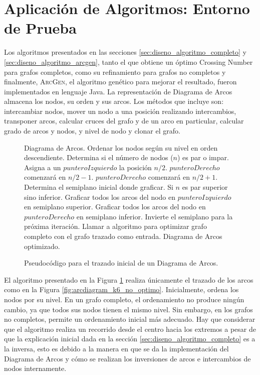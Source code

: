\section{Aplicación de Algoritmos: Entorno de Prueba}
Los algoritmos presentados en las secciones \ref{sec:diseno_algoritmo_completo} y \ref{sec:diseno_algoritmo_arcgen}, tanto el que obtiene un óptimo Crossing Number para grafos completos, como su refinamiento para grafos no completos y finalmente, \textsc{ArcGen}, el algoritmo genético para mejorar el resultado, fueron implementados en lenguaje Java. %
	La  representación de Diagrama de Arcos %
	almacena los nodos, su orden y sus arcos. Los métodos que incluye son: intercambiar nodos, mover un nodo a una posición realizando intercambios, transponer arcos, calcular cruces del grafo y de un arco en particular, calcular grado de arcos y nodos, y nivel de nodo y clonar el grafo.
		\begin{figure}
	    \begin{center}
		\begin{algorithmic}[1]
			\REQUIRE Diagrama de Arcos.
			\STATE Ordenar los nodos según su nivel en orden descendiente.
			\STATE Determina si el número de nodos ($n$) es par o impar.
			\STATE Asigna a un $punteroIzquierdo$ la posición $n/2$.
			\STATE $punteroDerecho$ comenzará en $n/2 - 1 $.
			\ELSE
			\STATE $punteroDerecho$ comenzará en $n/2 + 1 $.
			\ENDIF
			\STATE Determina el semiplano inicial donde graficar. Si $n$ es par superior sino inferior.
			\STATE Graficar todos los arcos del nodo en $punteroIzquierdo$ en semiplano superior.
			\ELSE 
			\STATE Graficar todos los arcos del nodo en $punteroDerecho$ en semiplano inferior.
			\ENDIF
			\STATE Invierte el semiplano para la próxima iteración.
			\ENDFOR
			\STATE Llamar a algoritmo para optimizar grafo completo con el grafo trazado como entrada.
			\ENSURE Diagrama de Arcos optimizado.
		\end{algorithmic}
	    \end{center}

		\caption{Pseudocódigo para el trazado inicial de un Diagrama de Arcos.}
		\label{alg:arcdiagram_trazado}
	\end{figure}
    El algoritmo presentado en la Figura \ref{alg:arcdiagram_trazado}  realiza únicamente el trazado de los arcos como en la Figura \ref{fig:arcdiagram_k6_no_optimo}. Inicialmente,  ordena los nodos por su nivel. En  un grafo completo, el ordenamiento no produce ningún cambio, ya que todos sus nodos tienen el mismo nivel. Sin embargo, en los grafos no completos, permite un ordenamiento inicial más adecuado. Hay que considerar que el algoritmo realiza un recorrido desde el centro hacia los extremos a pesar de que la explicación inicial dada en la sección \ref{sec:diseno_algoritmo_completo} es a la inversa, esto es debido a la manera en que se da la implementación del Diagrama de Arcos y cómo se realizan los inversiones de arcos e intercambios de nodos internamente.
